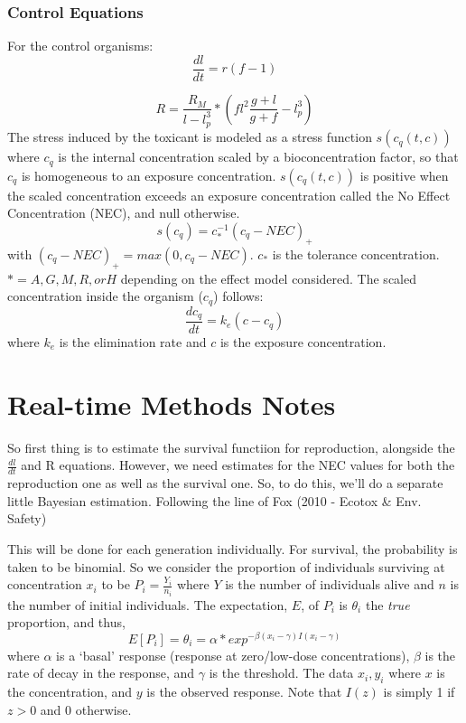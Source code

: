 \documentclass[
]{article}
\begin{document}
\hypertarget{control-equations}{%
\subsubsection{Control Equations}\label{control-equations}}

For the control organisms: \[\frac{dl}{dt} = r(f-1)\]

\[ R = \frac{R_M}{l-l^3_{p}} * (fl^2 \frac{g+l}{g+f} - l^3_{p})\] The
stress induced by the toxicant is modeled as a stress function
\(s(c_q(t,c))\) where \(c_q\) is the internal concentration scaled by a
bioconcentration factor, so that \(c_q\) is homogeneous to an exposure
concentration. \(s(c_q(t,c))\) is positive when the scaled concentration
exceeds an exposure concentration called the No Effect Concentration
(NEC), and null otherwise. \[s(c_q) = c^{-1}_*(c_q - NEC)_+\] with
\((c_q-NEC)_+ = max(0, c_q-NEC)\). \(c_*\) is the tolerance
concentration. \(* = A, G, M, R, or H\) depending on the effect model
considered. The scaled concentration inside the organism (\(c_q\))
follows: \[\frac{dc_q}{dt} = k_e(c-c_q) \] where \(k_e\) is the
elimination rate and \(c\) is the exposure concentration.

\hypertarget{real-time-methods-notes}{%
\section{Real-time Methods Notes}\label{real-time-methods-notes}}

So first thing is to estimate the survival functiion for reproduction,
alongside the \(\frac{dl}{dt}\) and R equations. However, we need
estimates for the NEC values for both the reproduction one as well as
the survival one. So, to do this, we'll do a separate little Bayesian
estimation. Following the line of Fox (2010 - Ecotox \& Env. Safety)

This will be done for each generation individually. For survival, the
probability is taken to be binomial. So we consider the proportion of
individuals surviving at concentration \(x_i\) to be
\(P_i = \frac{Y_i}{n_i}\) where \(Y\) is the number of individuals alive
and \(n\) is the number of initial individuals. The expectation, \(E\),
of \(P_i\) is \(\theta_i\) the \emph{true} proportion, and thus,
\[E[P_i] = \theta_i = \alpha*exp^{-\beta(x_i - \gamma)I(x_i - \gamma)}\]
where \(\alpha\) is a `basal' response (response at zero/low-dose
concentrations), \(\beta\) is the rate of decay in the response, and
\(\gamma\) is the threshold. The data \({x_i, y_i}\) where \(x\) is the
concentration, and \(y\) is the observed response. Note that \(I(z)\) is
simply 1 if \(z > 0\) and 0 otherwise.
\end{document}
